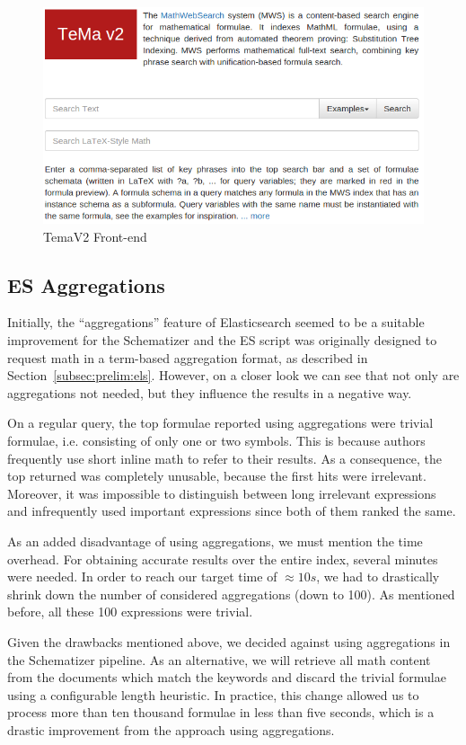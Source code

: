 \documentclass[a4paper,oneside]{article}
\begin{document}
\begin{figure}[ht]\centering
    \includegraphics[width=12.1cm]{img/frontend_temaV2.png}
    \caption{TemaV2 Front-end}\label{fig:frontend_temaV2}
\end{figure}
\FloatBarrier

\subsection{ES Aggregations}\label{subsec:esagg}
Initially, the ``aggregations'' feature of Elasticsearch seemed to be a
suitable improvement for the Schematizer and the ES script was originally
designed to request math in a term-based aggregation format, as described in
Section~\ref{subsec:prelim:els}. However, on a closer look we can see that not
only are aggregations not needed, but they influence the results in a negative
way.

On a regular query, the top formulae reported using aggregations were trivial
formulae, i.e. consisting of only one or two symbols. This is because authors
frequently use short inline math to refer to their results. As a consequence,
the top returned was completely unusable, because the first hits were
irrelevant. Moreover, it was impossible to distinguish between long irrelevant
expressions and infrequently used important expressions since both of them
ranked the same.

As an added disadvantage of using aggregations, we must mention the time
overhead. For obtaining accurate results over the entire index, several minutes
were needed. In order to reach our target time of $\approx 10s$, we had to
drastically shrink down the number of considered aggregations (down to 100).
As mentioned before, all these 100 expressions were trivial.

Given the drawbacks mentioned above, we decided against using aggregations in
the Schematizer pipeline. As an alternative, we will retrieve all math content
from the documents which match the keywords and discard the trivial formulae
using a configurable length heuristic. In practice, this change allowed us to
process more than ten thousand formulae in less than five seconds, which is a
drastic improvement from the approach using aggregations.
\end{document}
